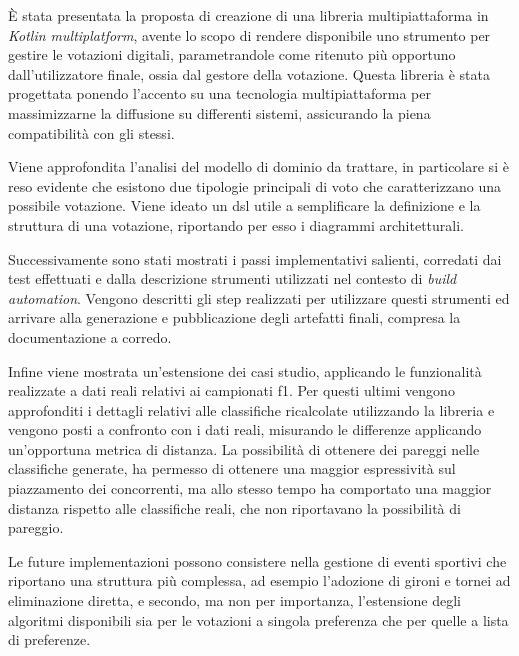 \documentclass[12pt,a4paper,openright,twoside]{book}
\begin{document}
È stata presentata la proposta di creazione di una libreria multipiattaforma in \textit{Kotlin multiplatform},
avente lo scopo di rendere disponibile uno strumento per gestire le votazioni digitali, parametrandole
come ritenuto più opportuno dall'utilizzatore finale, ossia dal gestore della votazione.
Questa libreria è stata  progettata ponendo l'accento su una tecnologia multipiattaforma per 
massimizzarne la diffusione su differenti sistemi, assicurando la piena compatibilità con gli stessi.

Viene approfondita l'analisi del modello di dominio da trattare, in particolare si è reso evidente
che esistono due tipologie principali di voto che caratterizzano una possibile votazione.
Viene ideato un \ac{dsl} utile a semplificare la definizione e la struttura di una votazione,
riportando per esso i diagrammi architetturali.

Successivamente sono stati mostrati i passi implementativi salienti, corredati dai test effettuati
e dalla descrizione strumenti utilizzati nel contesto di \textit{build automation}.
Vengono descritti gli step realizzati per utilizzare questi strumenti ed arrivare alla generazione
e pubblicazione degli artefatti finali, compresa la documentazione a corredo.

Infine viene mostrata un'estensione dei casi studio, applicando le funzionalità realizzate a
dati reali relativi ai campionati \ac{f1}.
Per questi ultimi vengono approfonditi i dettagli relativi alle classifiche ricalcolate utilizzando
la libreria e vengono posti a confronto con i dati reali, misurando le differenze applicando un'opportuna
metrica di distanza. La possibilità di ottenere dei pareggi nelle classifiche generate, ha permesso di
ottenere una maggior espressività sul piazzamento dei concorrenti, ma allo stesso tempo ha comportato 
una maggior distanza rispetto alle classifiche reali, che non riportavano la possibilità di pareggio.

Le future implementazioni possono consistere nella gestione di eventi sportivi che riportano una
struttura più complessa, ad esempio l'adozione di gironi e tornei ad eliminazione diretta,
e secondo, ma non per importanza, l'estensione degli algoritmi disponibili sia per le votazioni a 
singola preferenza che per quelle a lista di preferenze.


\backmatter

\nocite{*} %




\end{document}
